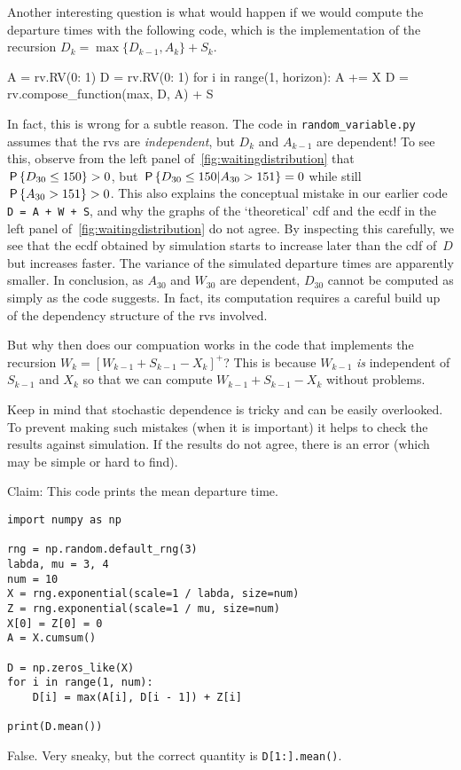 \documentclass[stochastic-or.tex]{subfiles}
\begin{document}
Another interesting question is what would happen if we would compute the departure times with the following code, which is the implementation of the recursion $D_{k} = \max\{D_{k-1}, A_{k}\} + S_{k}$.
\begin{python}
A = rv.RV({0: 1})
D = rv.RV({0: 1})
for i in range(1, horizon):
    A += X
    D = rv.compose_function(max, D, A) + S
\end{python}
\noindent In fact, this is wrong for a subtle reason.
The code in \texttt{random_variable.py} assumes that the rvs are \emph{independent}, but $D_{k}$ and $A_{k-1}$ are dependent!
To see this, observe from the left panel of~\cref{fig:waitingdistribution} that $\P{D_{30} \leq 150} > 0$, but $\P{D_{30} \leq 150| A_{30} > 151} = 0$ while still $\P{A_{30} > 151} > 0$.
This also explains the conceptual
mistake in our earlier code \texttt{D = A + W + S}, and why the graphs of the `theoretical' cdf and the ecdf in the left panel of~\cref{fig:waitingdistribution} do not agree.
By inspecting this carefully, we see that the ecdf obtained by simulation starts to increase later than the cdf of~$D$ but increases faster.
The variance of the simulated departure times are apparently smaller.
In conclusion, as $A_{30}$ and $W_{30}$ are dependent, $D_{30}$ cannot be computed as simply as the code suggests.
In fact, its computation requires a careful build up of the dependency structure of the rvs involved.

But why then does our compuation works in the code that implements the recursion $W_k = [W_{k-1} + S_{k-1} - X_k]^{+}$?
This is because $W_{k-1}$ \emph{is} independent of $S_{k-1}$ and $X_{k}$ so that we can compute $W_{k-1}+ S_{k-1} - X_{k}$ without problems.

Keep in mind that stochastic dependence is  tricky and can be easily overlooked.
To prevent making such mistakes (when it is important) it helps to check the results against simulation.
If the results do not agree, there is an error (which may be simple or hard to find).


\begin{truefalse}
Claim: This code prints the mean departure time.
\begin{verbatim}
import numpy as np

rng = np.random.default_rng(3)
labda, mu = 3, 4
num = 10
X = rng.exponential(scale=1 / labda, size=num)
Z = rng.exponential(scale=1 / mu, size=num)
X[0] = Z[0] = 0
A = X.cumsum()

D = np.zeros_like(X)
for i in range(1, num):
    D[i] = max(A[i], D[i - 1]) + Z[i]

print(D.mean())
\end{verbatim}
    \begin{solution}
        False. Very sneaky, but the correct quantity is \texttt{D[1:].mean()}.
    \end{solution}
\end{truefalse}
\end{document}
